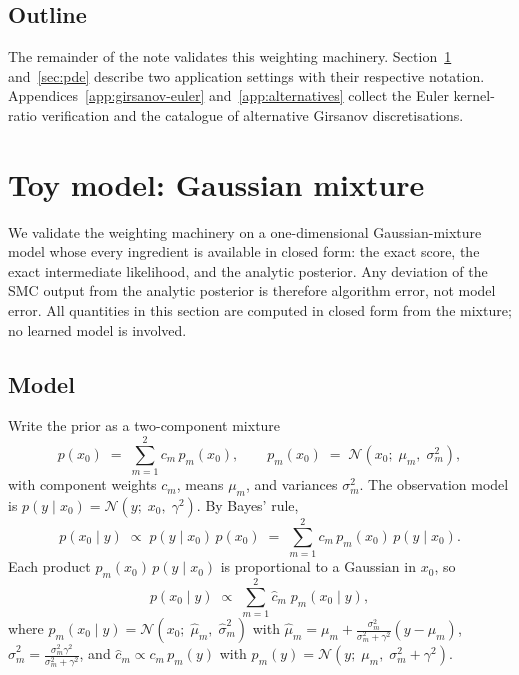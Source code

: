 \documentclass[11pt]{article}
\begin{document}
\subsection{Outline}

The remainder of the note validates this weighting machinery.
Section~\ref{sec:toy} and~\ref{sec:pde} describe two application settings
with their respective notation.
Appendices~\ref{app:girsanov-euler} and~\ref{app:alternatives} collect the
Euler kernel-ratio verification and the catalogue of alternative Girsanov
discretisations.

\section{Toy model: Gaussian mixture}\label{sec:toy}

We validate the weighting machinery on a one-dimensional Gaussian-mixture model whose
every ingredient is available in closed form: the exact score, the exact intermediate
likelihood, and the analytic posterior. Any deviation of the SMC output from the analytic
posterior is therefore algorithm error, not model error. All quantities in this section
are computed in closed form from the mixture; no learned model is involved.

\subsection{Model}

Write the prior as a two-component mixture
\begin{equation}\label{eq:mixture-prior}
  p(x_0) \;=\; \sum_{m=1}^{2} c_m\,p_m(x_0),
  \qquad
  p_m(x_0) \;=\; \mathcal{N}(x_0;\; \mu_m,\; \sigma_m^2),
\end{equation}
with component weights $c_m$, means $\mu_m$, and variances $\sigma_m^2$.
The observation model is $p(y\mid x_0) = \mathcal{N}(y;\; x_0,\;\gamma^2)$.
By Bayes' rule,
\begin{equation}\label{eq:posterior-factor}
  p(x_0\mid y) \;\propto\; p(y\mid x_0)\,p(x_0)
                     \;=\; \sum_{m=1}^{2} c_m\,p_m(x_0)\,p(y\mid x_0).
\end{equation}
Each product $p_m(x_0)\,p(y\mid x_0)$ is proportional to a Gaussian in $x_0$,
so
\begin{equation}\label{eq:analytic-posterior}
  p(x_0\mid y) \;\propto\; \sum_{m=1}^{2} \hat c_m\;p_m(x_0\mid y),
\end{equation}
where $p_m(x_0\mid y) = \mathcal{N}(x_0;\; \hat\mu_m,\; \hat\sigma_m^2)$ with
$\hat\mu_m = \mu_m + \frac{\sigma_m^2}{\sigma_m^2+\gamma^2}(y-\mu_m)$,
$\hat\sigma_m^2 = \frac{\sigma_m^2\gamma^2}{\sigma_m^2+\gamma^2}$,
and $\hat c_m \propto c_m\,p_m(y)$
with $p_m(y) = \mathcal{N}(y;\; \mu_m,\; \sigma_m^2+\gamma^2)$.
\end{document}
